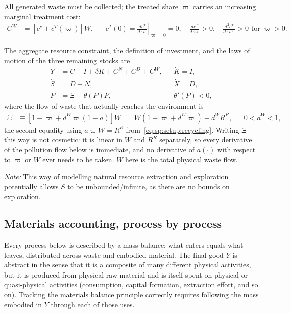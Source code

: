  All generated waste must be collected; the treated share $\varpi$ carries an increasing marginal treatment cost:
\begin{align}
C^W &= \left[c^c+c^T(\varpi)\right]W,
&&
c^T(0)=\left.\frac{dc^T}{d\varpi}\right|_{\varpi=0}=0,\quad
\frac{dc^T}{d\varpi}>0,\quad \frac{d^2c^T}{d\varpi^2}>0 \ \ \text{for }\varpi>0.
\label{eq:sp:setup:waste-cost}
\end{align}

 The aggregate resource constraint, the definition of investment, and the laws of motion of the three remaining stocks are
\begin{align}
Y &= C+I+\delta K+C^N+C^D+C^W,
&&
\dot K = I,
\label{eq:sp:setup:resource-constraint}
\\
\dot S &= D-N,
&&
\dot X = D,
\label{eq:sp:setup:reserves-motion}
\\
\dot P &= \Xi-\theta(P)P,
&&
\theta'(P)<0,
\label{eq:sp:setup:pollution-motion}
\end{align}
where the flow of waste that actually reaches the environment is
\begin{align}
\Xi &\equiv \left[1-\varpi+d^W\varpi\left(1-a\right)\right]W
\;=\; W\left(1-\varpi+d^W\varpi\right)-d^WR^R,
&&
0<d^W<1,
\label{eq:sp:setup:Xi}
\end{align}
the second equality using $a\varpi W=R^R$ from~\eqref{eq:sp:setup:recycling}. Writing $\Xi$ this way is not cosmetic: it is linear in $W$ and $R^R$ separately, so every derivative of the pollution flow below is immediate, and no derivative of $a(\cdot)$ with respect to $\varpi$ or $W$ ever needs to be taken. $W$ here is the total physical waste flow.


\textit{Note:} This way of modelling natural resource extraction and exploration potentially allows $S$ to be unbounded/infinite, as there are no bounds on exploration. 


\subsection{Materials accounting, process by process}
\label{sec:sp:setup:materialaccounting}
Every process below is described by a mass balance: what enters equals what leaves, distributed across waste and embodied material. The final good $Y$ is abstract in the sense that it is a composite of many different physical activities, but it is produced from physical raw material and is itself spent on physical or quasi-physical activities (consumption, capital formation, extraction effort, and so on). Tracking the materials balance principle correctly requires following the mass embodied in $Y$ through each of those uses.


